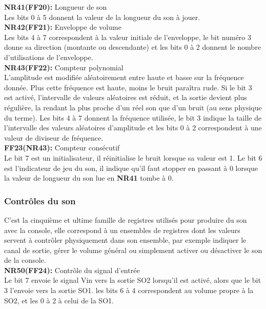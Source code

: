 \documentclass{report}
\begin{document}
	\textbf{NR41(FF20):} Longueur de son \\
		Les bits 0 à 5 donnent la valeur de la longueur du son
		à jouer.\\

	\textbf{NR42(FF21):} Enveloppe de volume\\
		Les bits 4 à 7 correspondent à la valeur initiale de
		l'enveloppe, le bit numéro 3 donne sa direction
		(montante ou descendante) et les bits 0 à 2 donnent le
		nombre d'utilisations de l'enveloppe.\\

	\textbf{NR43(FF22):} Compteur polynomial \\
		L'amplitude est modifiée aléatoirement entre haute et
		basse sur la fréquence donnée. Plus cette fréquence
		est haute, moins le bruit paraîtra rude. 
		Si le bit 3 est activé, l'intervalle de valeurs
		aléatoires est réduit, et la sortie devient plus
		régulière, la rendant la plus proche d'un réel
		son que d'un bruit (au sens physique du terme).
		Les bits 4 à 7 donnent la fréquence utilisée, le bit 3
		indique la taille de l'intervalle des valeurs
		aléatoires d'amplitude et les bits 0 à 2 correspondent
		à une valeur de diviseur de fréquence.\\ 

	\textbf{FF23(NR43):} Compteur consécutif\\
		Le bit 7 est un initialisateur, il réinitialise le bruit
		lorsque sa valeur est 1.
		Le bit 6 est l'indicateur de jeu du son, il indique
		qu'il faut stopper en passant à 0 lorsque la valeur de
		longueur du son lue en \textbf{NR41} tombe à 0. 
	\subsubsection{Contrôles du son}
		C'est la cinquième et ultime famille de registres
		utilisés pour produire du son avec la console, elle
		correspond à un ensembles de registres dont les
		valeurs servent à contrôler physiquement dans son
		ensemble, par exemple indiquer le canal de sortie,
		gérer le volume général ou simplement activer ou
		désactiver le son de la console. \\

	\textbf{NR50(FF24):} Contrôle du signal d'entrée \\ 
		Le bit 7 envoie le signal Vin vers la sortie SO2
		lorsqu'il est activé, alors que le bit 3 l'envoie vers
		la sortie SO1. les bits 6 à 4 correspondent au volume
		propre à la SO2, et les 0 à 2 à celui de la SO1. \\
\end{document}
